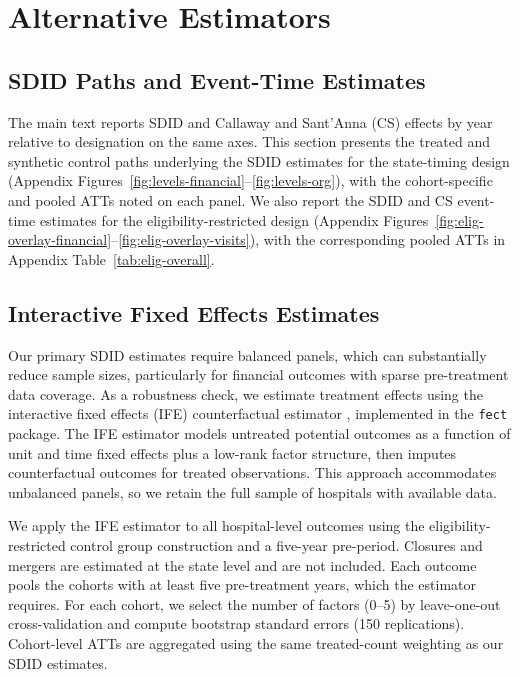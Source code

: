 \documentclass[a4paper, 12pt]{article}
\begin{document}

\section{Alternative Estimators}
\label{sec:app-alt}

\subsection{SDID Paths and Event-Time Estimates}

The main text reports SDID and Callaway and Sant'Anna (CS) effects by year relative to designation on the same axes. This section presents the treated and synthetic control paths underlying the SDID estimates for the state-timing design (Appendix Figures~\ref{fig:levels-financial}--\ref{fig:levels-org}), with the cohort-specific and pooled ATTs noted on each panel. We also report the SDID and CS event-time estimates for the eligibility-restricted design (Appendix Figures~\ref{fig:elig-overlay-financial}--\ref{fig:elig-overlay-visits}), with the corresponding pooled ATTs in Appendix Table~\ref{tab:elig-overall}.

\subsection{Interactive Fixed Effects Estimates}

Our primary SDID estimates require balanced panels, which can substantially reduce sample sizes, particularly for financial outcomes with sparse pre-treatment data coverage. As a robustness check, we estimate treatment effects using the interactive fixed effects (IFE) counterfactual estimator \citep{xu2017}, implemented in the \texttt{fect} package. The IFE estimator models untreated potential outcomes as a function of unit and time fixed effects plus a low-rank factor structure, then imputes counterfactual outcomes for treated observations. This approach accommodates unbalanced panels, so we retain the full sample of hospitals with available data.

We apply the IFE estimator to all hospital-level outcomes using the eligibility-restricted control group construction and a five-year pre-period. Closures and mergers are estimated at the state level and are not included. Each outcome pools the cohorts with at least five pre-treatment years, which the estimator requires. For each cohort, we select the number of factors (0--5) by leave-one-out cross-validation and compute bootstrap standard errors (150 replications). Cohort-level ATTs are aggregated using the same treated-count weighting as our SDID estimates.
\end{document}
